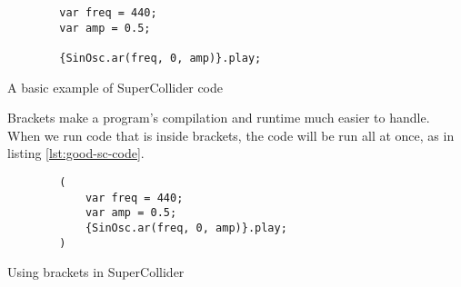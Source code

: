 \begin{listing}
	\begin{lstlisting}
		var freq = 440;
		var amp = 0.5;
		
		{SinOsc.ar(freq, 0, amp)}.play;
	\end{lstlisting}
	\caption{A basic example of SuperCollider code}
	\label{lst:basic-sc-code}
\end{listing}


Brackets make a program's compilation and runtime much easier to handle. When we run code that is inside brackets, the code will be run all at once, as in listing \ref{lst:good-sc-code}. 

\begin{listing}
	\begin{lstlisting}
		(
			var freq = 440;
			var amp = 0.5;
			{SinOsc.ar(freq, 0, amp)}.play;
		)
	\end{lstlisting}
	\caption{Using brackets in SuperCollider}
	\label{lst:good-sc-code}	
\end{listing}